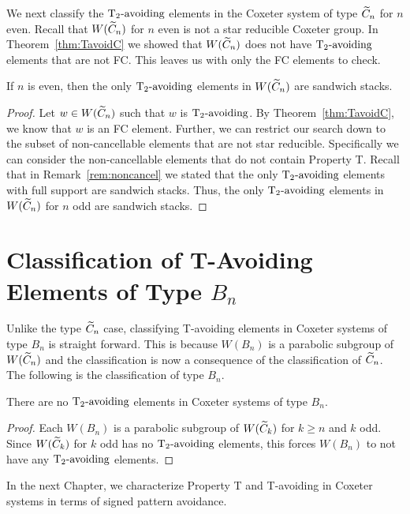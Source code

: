 We next classify the $\operatorname{T_2-\mathrm{avoiding}}$ elements in the Coxeter system of type $\widetilde{C}_n$ for $n$ even. Recall that $W(\widetilde{C}_n)$ for $n$ even is not a star reducible Coxeter group. In Theorem~\ref{thm:TavoidC} we showed that $W(\widetilde{C}_n)$ does not have $\operatorname{T_2-\mathrm{avoiding}}$ elements that are not FC. This leaves us with only the FC elements to check.

\begin{theorem}
	If $n$ is even, then the only $\operatorname{T_2-\mathrm{avoiding}}$ elements in $W(\widetilde{C}_n)$ are sandwich stacks.
	\begin{proof}
		Let $w \in W(\widetilde{C}_n)$ such that $w$ is $\operatorname{T_2-\mathrm{avoiding}}$. By Theorem~\ref{thm:TavoidC}, we know that $w$ is an FC element. Further, we can restrict our search down to the subset of non-cancellable elements that are not star reducible. Specifically we can consider the non-cancellable elements that do not contain Property T. Recall that in Remark~\ref{rem:noncancel} we stated that the only $\operatorname{T_2-\mathrm{avoiding}}$ elements with full support are sandwich stacks. Thus, the only $\operatorname{T_2-\mathrm{avoiding}}$ elements in $W(\widetilde{C}_n)$ for $n$ odd are sandwich stacks.
	\end{proof}
\end{theorem}

\section{Classification of T-Avoiding Elements of Type $B_n$}

Unlike the type $\widetilde{C}_n$ case, classifying T-avoiding elements in Coxeter systems of type $B_n$ is straight forward. This is because $W(B_n)$ is a parabolic subgroup of $W(\widetilde{C}_n)$ and the classification is now a consequence of the classification of $\widetilde{C}_n$. The following is the classification of type $B_n$.

\begin{theorem}\label{thm:typeB}
There are no $\operatorname{T_2-\mathrm{avoiding}}$ elements in Coxeter systems of type $B_n$.
\begin{proof}
	Each $W(B_n)$ is a parabolic subgroup of $W(\widetilde{C}_k)$ for $k \geq n$ and $k$ odd. Since $W(\widetilde{C}_k)$ for $k$ odd has no $\operatorname{T_2-\mathrm{avoiding}}$ elements, this forces $W(B_n)$ to not have any $\operatorname{T_2-\mathrm{avoiding}}$ elements.
\end{proof}
\end{theorem}
   
In the next Chapter, we characterize Property T and T-avoiding in Coxeter systems in terms of signed pattern avoidance.   